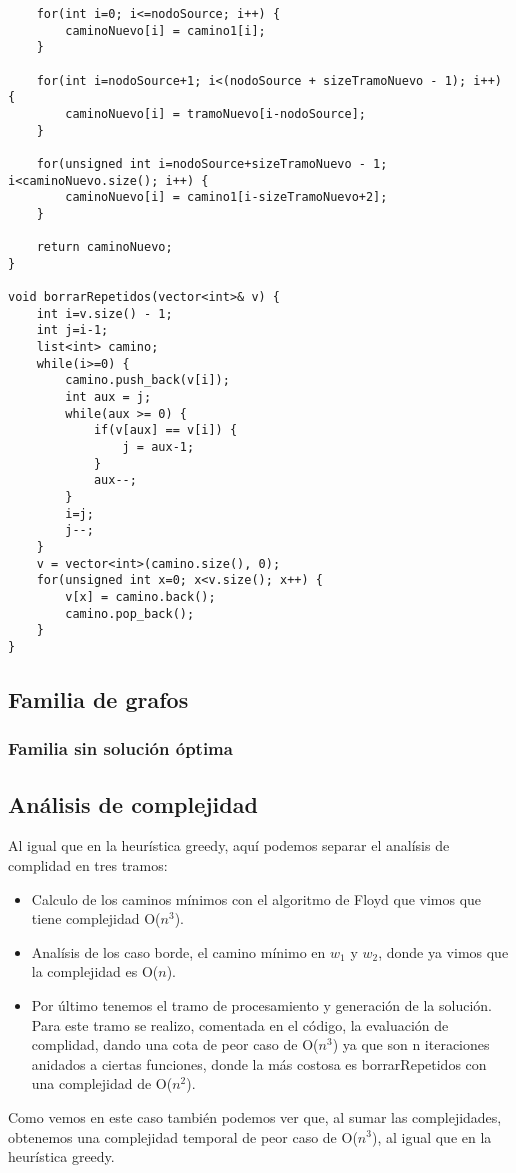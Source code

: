 \begin{lstlisting}
	for(int i=0; i<=nodoSource; i++) {
		caminoNuevo[i] = camino1[i];
	}

	for(int i=nodoSource+1; i<(nodoSource + sizeTramoNuevo - 1); i++) {
		caminoNuevo[i] = tramoNuevo[i-nodoSource];
	}

	for(unsigned int i=nodoSource+sizeTramoNuevo - 1; i<caminoNuevo.size(); i++) {
		caminoNuevo[i] = camino1[i-sizeTramoNuevo+2];
	}
	
	return caminoNuevo;
}

void borrarRepetidos(vector<int>& v) {
    int i=v.size() - 1;
    int j=i-1;
    list<int> camino;
    while(i>=0) {
        camino.push_back(v[i]);
        int aux = j;
        while(aux >= 0) {
            if(v[aux] == v[i]) {
            	j = aux-1;
            }
            aux--;
        }
        i=j;
        j--;
    }
    v = vector<int>(camino.size(), 0);
    for(unsigned int x=0; x<v.size(); x++) {
        v[x] = camino.back();
        camino.pop_back();
    }
}

\end{lstlisting}

\newpage
\subsection{Familia de grafos}
\subsubsection{Familia sin soluci\'on \'optima}

\newpage
\subsection{An\'alisis de complejidad}

Al igual que en la heur\'istica greedy, aqu\'i podemos separar el anal\'isis de complidad en tres tramos:
\begin{itemize}
\item Calculo de los caminos m\'inimos con el algoritmo de Floyd que vimos que tiene complejidad O($n^3$).
\item Anal\'isis de los caso borde, el camino m\'inimo en $w_1$ y $w_2$, donde ya vimos que la complejidad es O($n$).
\item Por \'ultimo tenemos el tramo de procesamiento y generaci\'on de la soluci\'on.
Para este tramo se realizo, comentada en el c\'odigo, la evaluaci\'on de complidad, dando una cota de peor caso de 
O($n^3$) ya que son n iteraciones anidados a ciertas funciones, donde la m\'as costosa es borrarRepetidos con una 
complejidad de O($n^2$).
\end{itemize}

Como vemos en este caso tambi\'en podemos ver que, al sumar las complejidades, obtenemos una complejidad temporal de
peor caso de O($n^3$), al igual que en la heur\'istica greedy.
